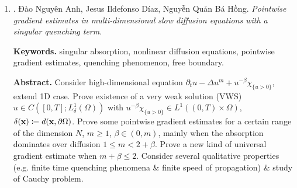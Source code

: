 \documentclass{article}
\begin{document}
\begin{enumerate}
	{\bf Abstract.} Consider a class of porous medium type of equations with Caputo time derivative. Prototype problem: $D_t^\alpha u = -\mathcal{L}u^m$ posed on a bounded Euclidean domain $\Omega\subset\mathbb{R}N$ with zero Dirichlet boundary conditions. The operator $\mathcal{L}$ falls within a wide class of either local or nonlocal operators, \& nonlinearity is allowed to be of degenerate or singular type, namely, $0 < m < 1$ \& $m > 1$. Most general form of a variety of models used to describe anomalous\footnote{different from what is normal or expected. dị thường.} diffusion processes with memory effects, \& finds application in various fields, e.g., visco-elastic materials, signal processing, biological systems, \& geophysical science. Prove existence of unique solution \& new $L^p$-$L^\infty$ smoothing effects. The comparison principle, provided in the most general setting, serves as a crucial tool in the proof \& provides a novel monotonicity formula. Consequently, establish: regularizing effects from diffusion are stronger than memory effects introduced by fractional time derivative. Solution attains boundary conditions pointwise. Prove: solution does not vanish in finite time if $0 < m < 1$, unlike case with classical time derivative. Provide a sharp rate of decay for any $L^p$-norm of solution for any $m > 0$. Memory effects weaken the spatial diffusion \& mitigate the difference between slow \& fast diffusion.
	
	
	\item \cite{Dao_Diaz_Nguyen2020}. {\sc Đào Nguyên Anh, Jesus Ildefonso D\'{i}az, Nguyễn Quản Bá Hồng}. {\it Pointwise gradient estimates in multi-dimensional slow diffusion equations with a singular quenching term}. {\sf[4 citations]}
	
	{\bf Keywords.} singular absorption, nonlinear diffusion equations, pointwise gradient estimates, quenching phenomenon, free boundary.
	
	{\bf Abstract.} Consider high-dimensional equation $\partial_tu - \Delta u^m + u^{-\beta}\chi_{\{u > 0\}}$, extend \cite{Kawohl_Kersner1992} 1D case. Prove existence of a very weak solution (VWS) $u\in C([0,T];L_\delta^1(\Omega))$ with $u^{-\beta}\chi_{\{u > 0\}}\in L^1((0,T)\times\Omega)$, $\delta({\bf x})\coloneqq d({\bf x},\partial\Omega)$. Prove some pointwise gradient estimates for a certain range of the dimension $N$, $m\ge1$, $\beta\in(0,m)$, mainly when the absorption dominates over diffusion $1\le m < 2 + \beta$. Prove a new kind of universal gradient estimate when $m + \beta\le2$. Consider several qualitative properties (e.g. finite time quenching phenomena \& finite speed of propagation) \& study of Cauchy problem.
	

\end{enumerate}
\end{document}
